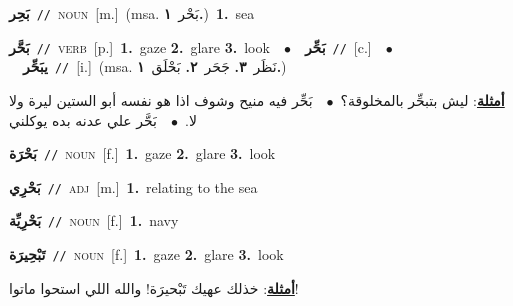 \documentclass[10pt,a4paper,twoside]{article} %
\begin{document}
\begin{multicols}{2}
{\setlength\topsep{0pt}\textbf{\foreignlanguage{arabic}{بَحِر}}\ {\color{gray}\texttt{//}\color{black}}\ \textsc{noun}\ [m.]\ \color{gray}(msa. \foreignlanguage{arabic}{بَحْر}~\foreignlanguage{arabic}{\textbf{١.}})\color{black}\ \textbf{1.}~sea\ } \vspace{2mm}

{\setlength\topsep{0pt}\textbf{\foreignlanguage{arabic}{بَحَّر}}\ {\color{gray}\texttt{//}\color{black}}\ \textsc{verb}\ [p.]\ \textbf{1.}~gaze  \textbf{2.}~glare  \textbf{3.}~look\ \ $\bullet$\ \ \setlength\topsep{0pt}\textbf{\foreignlanguage{arabic}{بَحِّر}}\ {\color{gray}\texttt{//}\color{black}}\ [c.]\ \ $\bullet$\ \ \setlength\topsep{0pt}\textbf{\foreignlanguage{arabic}{يبَحِّر}}\ {\color{gray}\texttt{//}\color{black}}\ [i.]\ \color{gray}(msa. \foreignlanguage{arabic}{نَظَر}~\foreignlanguage{arabic}{\textbf{٣.}}  \foreignlanguage{arabic}{جَحَر}~\foreignlanguage{arabic}{\textbf{٢.}}  \foreignlanguage{arabic}{بَحْلَق}~\foreignlanguage{arabic}{\textbf{١.}})\color{black}\  \begin{flushright}\color{gray}\foreignlanguage{arabic}{\textbf{\underline{\foreignlanguage{arabic}{أمثلة}}}: ليش بتبحِّر بالمخلوقة؟\ $\bullet$\ \  بَحِّر فيه منيح وشوف اذا هو نفسه أبو الستين ليرة ولا لا.\ $\bullet$\ \  بَحَّر علي عدنه بده يوكلني}\end{flushright}\color{black}} \vspace{2mm}

{\setlength\topsep{0pt}\textbf{\foreignlanguage{arabic}{بَحْرَة}}\ {\color{gray}\texttt{//}\color{black}}\ \textsc{noun}\ [f.]\ \textbf{1.}~gaze  \textbf{2.}~glare  \textbf{3.}~look\ } \vspace{2mm}

{\setlength\topsep{0pt}\textbf{\foreignlanguage{arabic}{بَحْرِي}}\ {\color{gray}\texttt{//}\color{black}}\ \textsc{adj}\ [m.]\ \textbf{1.}~relating to the sea\ } \vspace{2mm}

{\setlength\topsep{0pt}\textbf{\foreignlanguage{arabic}{بَحْرِيِّة}}\ {\color{gray}\texttt{//}\color{black}}\ \textsc{noun}\ [f.]\ \textbf{1.}~navy\ } \vspace{2mm}

{\setlength\topsep{0pt}\textbf{\foreignlanguage{arabic}{تَبْحِيرَة}}\ {\color{gray}\texttt{//}\color{black}}\ \textsc{noun}\ [f.]\ \textbf{1.}~gaze  \textbf{2.}~glare  \textbf{3.}~look\  \begin{flushright}\color{gray}\foreignlanguage{arabic}{\textbf{\underline{\foreignlanguage{arabic}{أمثلة}}}: خذلك عهيك تَبْحيرَة! والله اللي استحوا ماتوا!}\end{flushright}\color{black}} \vspace{2mm}


\end{multicols}
\end{document}
